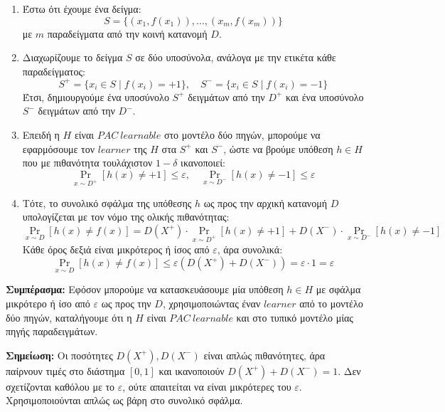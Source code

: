 \documentclass[12pt]{article}
\begin{document}
\begin{enumerate}
  \item Έστω ότι έχουμε ένα δείγμα:
  \[
  S = \{(x_1, f(x_1)), \dots, (x_m, f(x_m))\}
  \]
  με $m$ παραδείγματα από την κοινή κατανομή $D$.

  \item Διαχωρίζουμε το δείγμα $S$ σε δύο υποσύνολα, ανάλογα με την ετικέτα κάθε παραδείγματος:
  \[
  S^+ = \{x_i \in S \mid f(x_i) = +1\}, \quad S^- = \{x_i \in S \mid f(x_i) = -1\}
  \]
  Έτσι, δημιουργούμε ένα υποσύνολο $S^+$ δειγμάτων από την $D^+$ και ένα υποσύνολο $S^-$ δειγμάτων από την $D^-$.

  \item Επειδή η $H$ είναι $PAC\ learnable$ στο μοντέλο δύο πηγών, μπορούμε να εφαρμόσουμε τον $learner$ της $H$ στα $S^+$ και $S^-$, ώστε να βρούμε υπόθεση $h \in H$ που με πιθανότητα τουλάχιστον $1 - \delta$ ικανοποιεί:
  \[
  \Pr_{x \sim D^+}[h(x) \neq +1] \leq \varepsilon, \quad
  \Pr_{x \sim D^-}[h(x) \neq -1] \leq \varepsilon
  \]

  \item Τότε, το συνολικό σφάλμα της υπόθεσης $h$ ως προς την αρχική κατανομή $D$ υπολογίζεται με τον νόμο της ολικής πιθανότητας:
  \[
  \Pr_{x \sim D}[h(x) \neq f(x)] = D(X^+) \cdot \Pr_{x \sim D^+}[h(x) \neq +1] + D(X^-) \cdot \Pr_{x \sim D^-}[h(x) \neq -1]
  \]
  Κάθε όρος δεξιά είναι μικρότερος ή ίσος από $\varepsilon$, άρα συνολικά:
  \[
  \Pr_{x \sim D}[h(x) \neq f(x)] \leq \varepsilon (D(X^+) + D(X^-)) = \varepsilon \cdot 1 = \varepsilon
  \]
\end{enumerate}

\textbf{Συμπέρασμα:} Εφόσον μπορούμε να κατασκευάσουμε μία υπόθεση $h \in H$ με σφάλμα μικρότερο ή ίσο από $\varepsilon$ ως προς την $D$, χρησιμοποιώντας έναν $learner$ από το μοντέλο δύο πηγών, καταλήγουμε ότι η $H$ είναι $PAC\ learnable$ και στο τυπικό μοντέλο μίας πηγής παραδειγμάτων.

\vspace{1em}
\textbf{Σημείωση:} Οι ποσότητες $D(X^+), D(X^-)$ είναι απλώς πιθανότητες, άρα παίρνουν τιμές στο διάστημα $[0,1]$ και ικανοποιούν $D(X^+) + D(X^-) = 1$. Δεν σχετίζονται καθόλου με το $\varepsilon$, ούτε απαιτείται να είναι μικρότερες του $\varepsilon$. Χρησιμοποιούνται απλώς ως βάρη στο συνολικό σφάλμα.
\end{document}
